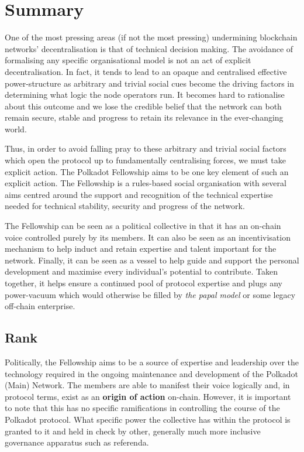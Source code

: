 \documentclass[9pt,oneside]{amsart}
\begin{document}
\section{Summary}\label{summary}

One of the most pressing areas (if not the most pressing) undermining blockchain networks' decentralisation is that of technical decision making. The avoidance of formalising any specific organisational model is not an act of explicit decentralisation. In fact, it tends to lead to an opaque and centralised effective power-structure as arbitrary and trivial social cues become the driving factors in determining what logic the node operators run. It becomes hard to rationalise about this outcome and we lose the credible belief that the network can both remain secure, stable and progress to retain its relevance in the ever-changing world.

Thus, in order to avoid falling pray to these arbitrary and trivial social factors which open the protocol up to fundamentally centralising forces, we must take explicit action. The Polkadot Fellowship aims to be one key element of such an explicit action. The Fellowship is a rules-based social organisation with several aims centred around the support and recognition of the technical expertise needed for technical stability, security and progress of the network.

The Fellowship can be seen as a political collective in that it has an on-chain voice controlled purely by its members. It can also be seen as an incentivisation mechanism to help induct and retain expertise and talent important for the network. Finally, it can be seen as a vessel to help guide and support the personal development and maximise every individual's potential to contribute. Taken together, it helps ensure a continued pool of protocol expertise and plugs any power-vacuum which would otherwise be filled by \emph{the papal model} or some legacy off-chain enterprise.


\subsection{Rank}

Politically, the Fellowship aims to be a source of expertise and leadership over the technology required in the ongoing maintenance and development of the Polkadot (Main) Network. The members are able to manifest their voice logically and, in protocol terms, exist as an \textbf{origin of action} on-chain. However, it is important to note that this has no specific ramifications in controlling the course of the Polkadot protocol. What specific power the collective has within the protocol is granted to it and held in check by other, generally much more inclusive governance apparatus such as referenda.
\end{document}
